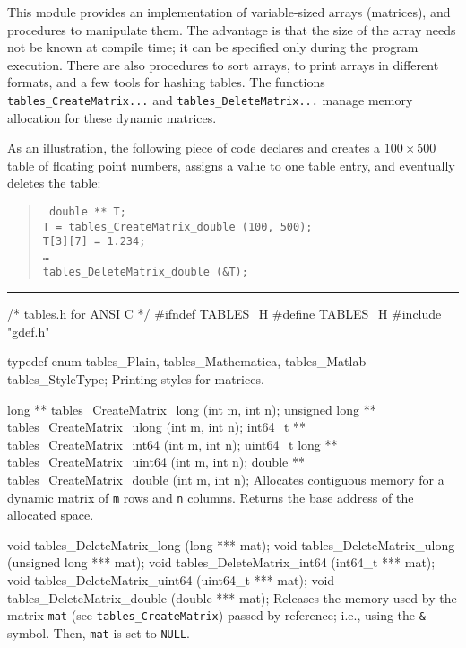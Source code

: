 
This module provides an implementation of variable-sized arrays (matrices),
and procedures to manipulate them.
The advantage is that the size of the array needs not be known
at compile time; it can be specified only during the program execution.
There are also procedures to sort arrays,  to
print  arrays in different formats,
and a few tools for hashing tables.
The functions {\tt tables\_CreateMatrix...} and
{\tt tables\_DeleteMatrix...} manage memory allocation for
these dynamic matrices.

As an illustration, the following piece of code declares and creates
a $100\times 500$ table of floating point numbers, assigns a value
to one table entry, and eventually deletes the table:
  \begin{verse}{\tt
    double ** T;\\
    T = tables\_CreateMatrix\_double (100, 500);\\
    T[3][7] = 1.234;\\
    \dots \\
    tables\_DeleteMatrix\_double (\&T);
  }\end{verse}

\bigskip\hrule

\code\hide
/* tables.h for ANSI C */
#ifndef TABLES_H
#define TABLES_H
\endhide
#include "gdef.h"
\endcode

\code

typedef enum {
   tables_Plain,
   tables_Mathematica,
   tables_Matlab
   } tables_StyleType;
\endcode
  \tab Printing styles for matrices.
  \endtab

\code

long ** tables_CreateMatrix_long  (int m, int n);
unsigned long ** tables_CreateMatrix_ulong (int m, int n);
int64_t ** tables_CreateMatrix_int64  (int m, int n);
uint64_t long ** tables_CreateMatrix_uint64 (int m, int n);
double ** tables_CreateMatrix_double  (int m, int n);
\endcode
  \tab Allocates contiguous memory for a dynamic 
  matrix of {\tt m} rows and {\tt n} columns. Returns the base
  address of the allocated space.
  \endtab
\code

void tables_DeleteMatrix_long  (long *** mat);
void tables_DeleteMatrix_ulong (unsigned long *** mat);
void tables_DeleteMatrix_int64  (int64_t *** mat);
void tables_DeleteMatrix_uint64 (uint64_t *** mat);
void tables_DeleteMatrix_double  (double *** mat);
\endcode
  \tab Releases the memory used by the matrix {\tt mat}
  (see {\tt tables\_CreateMatrix}) passed by reference; i.e., using the {\tt \&} symbol. 
  Then, {\tt mat} is set to {\tt NULL}.
  \endtab
\code

